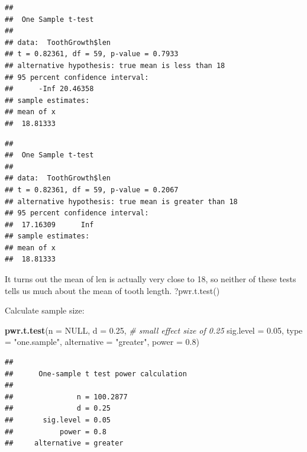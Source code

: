 \documentclass[]{book}
\newenvironment{Shaded}{\begin{snugshade}}{\end{snugshade}}
\newcommand{\CommentTok}[1]{\textcolor[rgb]{0.56,0.35,0.01}{\textit{#1}}}
\newcommand{\DataTypeTok}[1]{\textcolor[rgb]{0.13,0.29,0.53}{#1}}
\newcommand{\DecValTok}[1]{\textcolor[rgb]{0.00,0.00,0.81}{#1}}
\newcommand{\FloatTok}[1]{\textcolor[rgb]{0.00,0.00,0.81}{#1}}
\newcommand{\KeywordTok}[1]{\textcolor[rgb]{0.13,0.29,0.53}{\textbf{#1}}}
\newcommand{\NormalTok}[1]{#1}
\newcommand{\OperatorTok}[1]{\textcolor[rgb]{0.81,0.36,0.00}{\textbf{#1}}}
\newcommand{\OtherTok}[1]{\textcolor[rgb]{0.56,0.35,0.01}{#1}}
\newcommand{\StringTok}[1]{\textcolor[rgb]{0.31,0.60,0.02}{#1}}
\begin{document}
\begin{verbatim}
## 
## 	One Sample t-test
## 
## data:  ToothGrowth$len
## t = 0.82361, df = 59, p-value = 0.7933
## alternative hypothesis: true mean is less than 18
## 95 percent confidence interval:
##      -Inf 20.46358
## sample estimates:
## mean of x 
##  18.81333
\end{verbatim}

\begin{Shaded}
\end{Shaded}

\begin{verbatim}
## 
## 	One Sample t-test
## 
## data:  ToothGrowth$len
## t = 0.82361, df = 59, p-value = 0.2067
## alternative hypothesis: true mean is greater than 18
## 95 percent confidence interval:
##  17.16309      Inf
## sample estimates:
## mean of x 
##  18.81333
\end{verbatim}

It turns out the mean of len is actually very close to 18, so neither of these tests tells us much about the mean of tooth length.
?pwr.t.test()

Calculate sample size:

\begin{Shaded}
\begin{Highlighting}[]
\KeywordTok{pwr.t.test}\NormalTok{(}\DataTypeTok{n =} \OtherTok{NULL}\NormalTok{,}
           \DataTypeTok{d =} \FloatTok{0.25}\NormalTok{,  }\CommentTok{# small effect size of 0.25}
           \DataTypeTok{sig.level =} \FloatTok{0.05}\NormalTok{, }
           \DataTypeTok{type =} \StringTok{"one.sample"}\NormalTok{, }
           \DataTypeTok{alternative =} \StringTok{"greater"}\NormalTok{, }
           \DataTypeTok{power =} \FloatTok{0.8}\NormalTok{)}
\end{Highlighting}
\end{Shaded}

\begin{verbatim}
## 
##      One-sample t test power calculation 
## 
##               n = 100.2877
##               d = 0.25
##       sig.level = 0.05
##           power = 0.8
##     alternative = greater
\end{verbatim}
\end{document}
